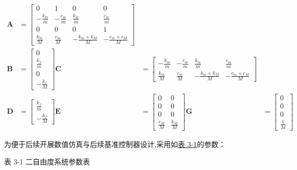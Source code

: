 \documentclass{scrbook}
\begin{document}
{\begin{align}
\tag{3-3}
\mathbf{A}&=\begin{bmatrix}
0 & 1 & 0 & 0\\
-\frac{k_{m}}{m} & -\frac{c_{m}}{m} & \frac{k_{m}}{m} & \frac{c_{m}}{m}\\
0 & 0 & 0 & 1\\
\frac{k_{m}}{M} & \frac{c_{m}}{M} & -\frac{k_{m}+k_{M}}{M} & -\frac{c_{m}+c_{M}}{M}
\end{bmatrix} \\
\tag{3-4}
\mathbf{B}&=\left[\begin{array}{c}
0\\
\frac{k_{f}}{m}\\
0\\
-\frac{k_{f}}{M}
\end{array}\right]\mathbf{C}&=\begin{bmatrix}
-\frac{k_{m}}{m} & -\frac{c_{m}}{m} & \frac{k_{m}}{m} & \frac{c_{m}}{m}\\
\frac{k_{m}}{M} & \frac{c_{m}}{M} & -\frac{k_{m}+k_{M}}{M} & -\frac{c_{m}+c_{M}}{M}
\end{bmatrix} \\
\tag{3-5}
\mathbf{D}&=\left[\begin{array}{c}
\frac{k_{f}}{m}\\
-\frac{k_{f}}{M}
\end{array}\right]\mathbf{E}&=\begin{bmatrix}
0 & 0\\
0 & 0\\
0 & 0\\
\frac{c_{M}}{M} & \frac{k_{M}}{M}
\end{bmatrix}\mathbf{G}&=\left[\begin{array}{c}
0\\
0\\
0\\
\frac{1}{M}
\end{array}\right] 
\end{align}

为便于后续开展数值仿真与后续基准控制器设计,采用如{\hyperref[ref-044]{表 3-1}}的参数：

{\centering 表 3-1 二自由度系统参数表\label{ref-044}

}}
\end{document}
